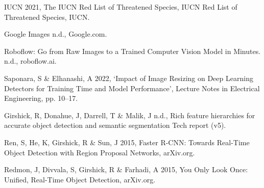 \documentclass[runningheads]{llncs}
\begin{document}
\begin{thebibliography}{8}
IUCN 2021, The IUCN Red List of Threatened Species, IUCN Red List of Threatened Species, IUCN.

Google Images n.d., Google.com.

Roboflow: Go from Raw Images to a Trained Computer Vision Model in Minutes. n.d., roboflow.ai.

Saponara, S \& Elhanashi, A 2022, `Impact of Image Resizing on Deep Learning Detectors for Training Time and Model Performance', Lecture Notes in Electrical Engineering, pp. 10–17.

Girshick, R, Donahue, J, Darrell, T \& Malik, J n.d., Rich feature hierarchies for accurate object detection and semantic segmentation Tech report (v5).

Ren, S, He, K, Girshick, R \& Sun, J 2015, Faster R-CNN: Towards Real-Time Object Detection with Region Proposal Networks, arXiv.org.

Redmon, J, Divvala, S, Girshick, R \& Farhadi, A 2015, You Only Look Once: Unified, Real-Time Object Detection, arXiv.org.



\end{thebibliography}
\end{document}
